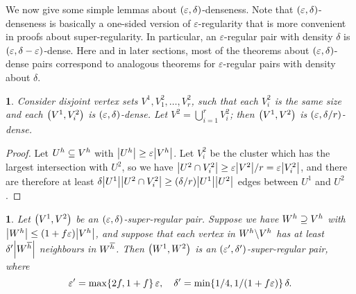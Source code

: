 \documentclass[11pt,english]{article}
\theoremstyle{plain}
\theoremstyle{plain}
\theoremstyle{plain}
\newtheorem{lem}[thm]{\protect\lemmaname}
\theoremstyle{plain}
\theoremstyle{plain}
\theoremstyle{definition}
\theoremstyle{definition}
\theoremstyle{remark}
\theoremstyle{remark}
\theoremstyle{plain}
\theoremstyle{definition}
\theoremstyle{definition}
\theoremstyle{plain}
\theoremstyle{plain}
\theoremstyle{plain}
\newtheorem{mylem}[mythm]{\protect\lemmaname}
\renewenvironment{lem}{\begin{mylem}}{\end{mylem}}
\theoremstyle{plain}
\theoremstyle{remark}
\theoremstyle{plain}
\theoremstyle{definition}
\let\originalleft\left
\let\originalright\right
\renewcommand{\left}{\mathopen{}\mathclose\bgroup\originalleft}
\renewcommand{\right}{\aftergroup\egroup\originalright}
\providecommand{\lemmaname}{Lemma}
\begin{document}
We now give some simple lemmas about $\left(\varepsilon,\delta\right)$-denseness.
Note that $\left(\varepsilon,\delta\right)$-denseness is basically
a one-sided version of $\varepsilon$-regularity that is more convenient
in proofs about super-regularity. In particular, an $\varepsilon$-regular
pair with density $\delta$ is $\left(\varepsilon,\delta-\varepsilon\right)$-dense.
Here and in later sections, most of the theorems about $\left(\varepsilon,\delta\right)$-dense
pairs correspond to analogous theorems for $\varepsilon$-regular
pairs with density about $\delta$.
\begin{lem}
\label{lem:combine-clusters}Consider disjoint vertex sets $V^{1},V_{1}^{2},\dots,V_{r}^{2}$,
such that each $V_{i}^{2}$ is the same size and each $\left(V^{1},V_{i}^{2}\right)$
is $\left(\varepsilon,\delta\right)$-dense. Let $V^{2}=\bigcup_{i=1}^{r}V_{i}^{2}$;
then $\left(V^{1},V^{2}\right)$ is $\left(\varepsilon,\delta/r\right)$-dense.\end{lem}
\begin{proof}
Let $U^{h}\subseteq V^{h}$ with $\left|U^{\h}\right|\ge\varepsilon\left|V^{\h}\right|$.
Let $V_{i}^{2}$ be the cluster which has the largest intersection
with $U^{2}$, so we have $\left|U^{2}\cap V_{i}^{2}\right|\ge\varepsilon\left|V^{2}\right|/r=\varepsilon\left|V_{i}^{2}\right|$,
and there are therefore at least $\delta\left|U^{1}\right|\left|U^{2}\cap V_{i}^{2}\right|\ge\left(\delta/r\right)\left|U^{1}\right|\left|U^{2}\right|$
edges between $U^{1}$ and $U^{2}$.\end{proof}
\begin{lem}
\label{lem:robust-regular}Let $\left(V^{1},V^{2}\right)$ be an $\left(\varepsilon,\delta\right)$-super-regular
pair. Suppose we have $W^{h}\supseteq V^{h}$ with $\left|W^{\h}\right|\le\left(1+f\varepsilon\right)\left|V^{\h}\right|$,
and suppose that each vertex in $W^{h}\backslash V^{h}$ has at
least $\delta'\left|W^{\flip{\h}}\right|$ neighbours in $W^{\overline{h}}$.
Then $\left(W^{1},W^{2}\right)$ is an $\left(\varepsilon',\delta'\right)$-super-regular
pair, where 
\[
\varepsilon'=\max\left\{ 2f,1+f\right\} \,\varepsilon,\quad\delta'=\min\left\{ 1/4,1/\left(1+f\varepsilon\right)\right\} \,\delta.
\]
\end{lem}
\end{document}
